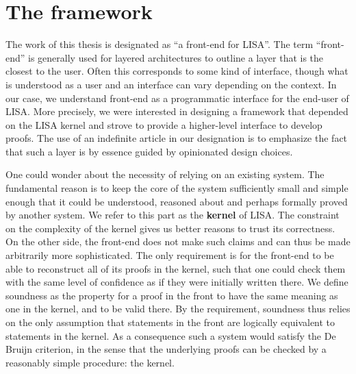 \section{The framework}
\label{sec:framework}

The work of this thesis is designated as ``a front-end for LISA''. The term ``front-end'' is generally used for layered architectures to outline a layer that is the closest to the user. Often this corresponds to some kind of interface, though what is understood as a user and an interface can vary depending on the context. In our case, we understand front-end as a programmatic interface for the end-user of LISA. More precisely, we were interested in designing a framework that depended on the LISA kernel and strove to provide a higher-level interface to develop proofs. The use of an indefinite article in our designation is to emphasize the fact that such a layer is by essence guided by opinionated design choices.

One could wonder about the necessity of relying on an existing system. The fundamental reason is to keep the core of the system sufficiently small and simple enough that it could be understood, reasoned about and perhaps formally proved by another system. We refer to this part as the \textbf{kernel} of LISA. The constraint on the complexity of the kernel gives us better reasons to trust its correctness. On the other side, the front-end does not make such claims and can thus be made arbitrarily more sophisticated. The only requirement is for the front-end to be able to reconstruct all of its proofs in the kernel, such that one could check them with the same level of confidence as if they were initially written there. We define soundness as the property for a proof in the front to have the same meaning as one in the kernel, and to be valid there. By the requirement, soundness thus relies on the only assumption that statements in the front are logically equivalent to statements in the kernel. As a consequence such a system would satisfy the De Bruijn criterion, in the sense that the underlying proofs can be checked by a reasonably simple procedure: the kernel.

